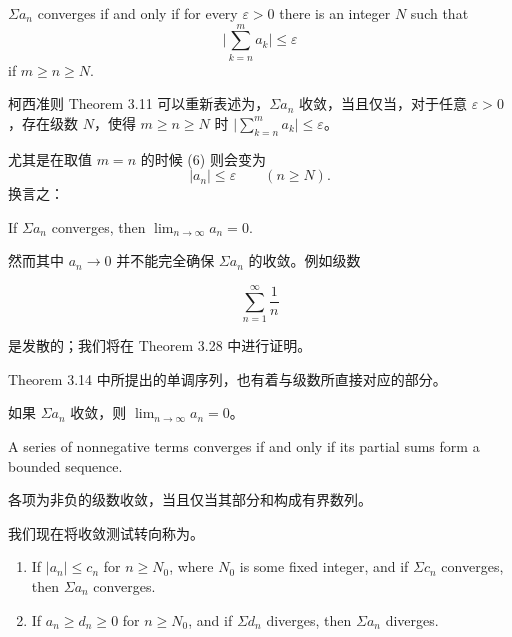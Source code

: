 \documentclass[../poma-notes.tex]{subfiles}
\begin{document}
\begin{theorem}
  $\Sigma a_n$ converges if and only if for every $\varepsilon > 0$ there is an integer $N$ such that
  \begin{equation}
    \Bigg| \sum_{k=n}^{m} a_k \Bigg| \le \varepsilon
  \end{equation}
  if $m \ge n \ge N$.
\end{theorem}

\begin{anote}
  柯西准则 Theorem 3.11 可以重新表述为，$\Sigma a_n$ 收敛，当且仅当，对于任意 $\varepsilon > 0$，存在级数 $N$，使得
  $m \ge n \ge N$ 时 $\Bigg| \sum_{k=n}^{m} a_k \Bigg| \le \varepsilon$。
\end{anote}

尤其是在取值 $m = n$ 的时候 (6) 则会变为
\[|a_n| \le \varepsilon \qquad (n \ge N).\]
换言之：

\begin{theorem}
  If $\Sigma a_n$ converges, then $\lim_{n \to \infty} a_n = 0$.
\end{theorem}

然而其中 $a_n \to 0$ 并不能完全确保 $\Sigma a_n$ 的收敛。例如级数

\[\sum_{n=1}^{\infty} \frac{1}{n}\]

是发散的；我们将在 Theorem 3.28 中进行证明。

Theorem 3.14 中所提出的单调序列，也有着与级数所直接对应的部分。

\anote 如果 $\Sigma a_n$ 收敛，则 $\lim_{n \to \infty} a_n = 0$。

\begin{theorem}
  A series of nonnegative terms converges if and only if its partial sums form a bounded sequence.
\end{theorem}

\anote 各项为非负的级数收敛，当且仅当其部分和构成有界数列。

我们现在将收敛测试转向称为。

\begin{theorem}
  \begin{enumerate}[label=(\alph*)]
    \item If $|a_n| \le c_n$ for $n \ge N_0$, where $N_0$ is some fixed integer, and if $\Sigma c_n$ converges,
          then $\Sigma a_n$ converges.
    \item If $a_n \ge d_n \ge 0$ for $n \ge N_0$, and if $\Sigma d_n$ diverges, then $\Sigma a_n$ diverges.
  \end{enumerate}
\end{theorem}
\end{document}
